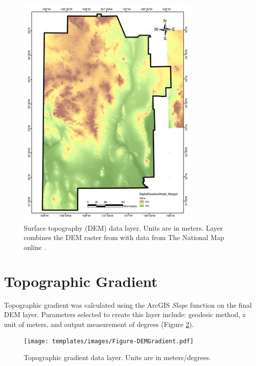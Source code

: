 \begin{figure}[H]
\centering
\includegraphics[width=0.8\textwidth]{templates/images/Figure-DEM.pdf}
\caption[Surface topography (DEM) data layer]{Surface topography (DEM) data layer. Units are in meters. Layer combines the DEM raster from \citet{bielicki_hydrogeolgic_2015} with data from The National Map online \citep{usgs_tnm_2021}.}
\label{fig:feat_dem}
\end{figure}
\pagebreak

\section{Topographic Gradient}\label{app:dl_dem_gradient}
Topographic gradient was calculated using the ArcGIS \textit{Slope} function on the final DEM layer. Parameters selected to create this layer include: geodesic method, z unit of meters, and output measurement of degrees (Figure \ref{fig:feat_dem_gradient}).

\begin{figure}[H]
\centering
\texttt{[image: templates/images/Figure-DEMGradient.pdf]}
\caption[Topographic gradient data layer]{Topographic gradient data layer. Units are in meters/degrees.}
\label{fig:feat_dem_gradient}
\end{figure}
\pagebreak

